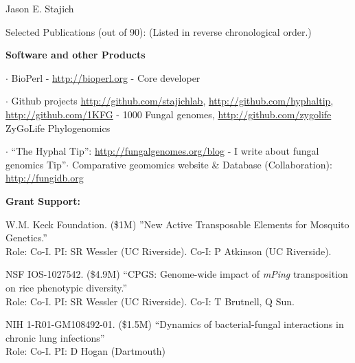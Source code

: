 \documentclass[10pt]{article}
\begin{document}
\begin{cv}{\centerline{Jason E. Stajich}}
\begin{cvlist}{Selected Publications (out of 90): (Listed in reverse chronological order.)}
\begin{cvlistcompact}{\bf Software and other Products}
  \item $\cdot$ BioPerl - \url{http://bioperl.org} - Core developer
\item  $\cdot$ Github projects \url{http://github.com/stajichlab},
  \url{http://github.com/hyphaltip}, \url{http://github.com/1KFG} - 1000 Fungal
   genomes, \url{http://github.com/zygolife} ZyGoLife Phylogenomics
\item $\cdot$ ``The Hyphal Tip'': \url{http://fungalgenomes.org/blog}
  - I write about fungal genomics
  Tip''$\cdot$ Comparative geomomics website \& Database (Collaboration): \url{http://fungidb.org}
\end{cvlistcompact}


\end{cvlist}
\setlength{\cvlabelwidth}{24mm}


\begin{cvlistcompact}{\bf Grant Support:}
\item [{\bf Ongoing support}]

\item [2011-2016] W.M. Keck Foundation. (\$1M) ''New Active
  Transposable Elements for Mosquito Genetics.'' \\
Role: Co-I. PI: SR Wessler (UC Riverside). Co-I: P Atkinson (UC Riverside). 

\item [2011-2017] NSF IOS-1027542. (\$4.9M) ``CPGS: Genome-wide impact of \textit{mPing} transposition on rice phenotypic diversity.'' \\
Role: Co-I. PI: SR Wessler (UC Riverside). Co-I: T Brutnell, Q Sun. 

\item [2014-2017] NIH 1-R01-GM108492-01. (\$1.5M) ``Dynamics of bacterial-fungal interactions in chronic lung infections'' \\
Role: Co-I. PI: D Hogan (Dartmouth)


\end{cvlistcompact}
\end{cv}
\end{document}
